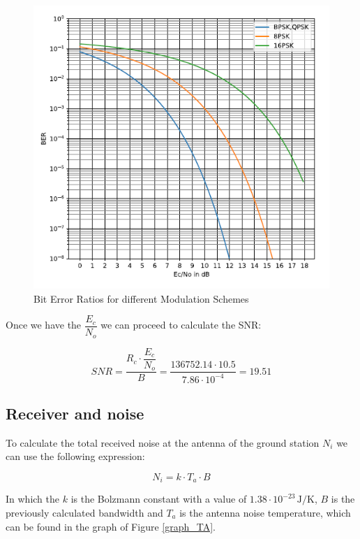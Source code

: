 \documentclass[a4paper,12pt,calibri,oneside,openany]{book}
\newcommand{\unit}[1]{\ensuremath{\, \mathrm{#1}}}
\theoremstyle{break}
\begin{document}
		\begin{figure}[h]
			\centering
			\includegraphics[width=14cm]{graph_BER}
			\caption{Bit Error Ratios for different Modulation Schemes }
			\label{graf_BER}
		\end{figure}
	
		Once we have the $\dfrac{E_{c}}{N_{o}}$ we can proceed to calculate the SNR:
		
		\begin{equation} \label{eq_snr}
			SNR = \dfrac{R_{c} \cdot \dfrac{E_{c}} {N_{o}}}{B} = \dfrac{136752.14 \cdot 10.5} {7.86 \cdot 10^{-4}} = 19.51
		\end{equation}
		
	\subsection{Receiver and noise}	
		
		 To calculate the total received noise at the antenna of the ground station $N_{i}$ we can use the following expression: 
		 
		 \begin{equation} \label{eq_ni}
		 	N_{i} = k \cdot T_{a} \cdot B
		 \end{equation}
	
		In which the $k$ is the Bolzmann constant with a value of $ 1.38 \cdot 10^{-23} \unit{J/K}$, $B$ is the previously calculated bandwidth and $T_{a}$ is the antenna noise temperature, which can be found in the graph of Figure \ref{graph_TA}.
		
\end{document}
